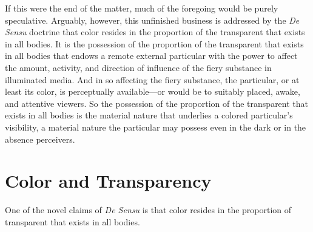 If this were the end of the matter, much of the foregoing would be purely speculative. Arguably, however, this unfinished business is addressed by the \emph{De Sensu} doctrine that color resides in the proportion of the transparent that exists in all bodies. It is the possession of the proportion of the transparent that exists in all bodies that endows a remote external particular with the power to affect the amount, activity, and direction of influence of the fiery substance in illuminated media. And in so affecting the fiery substance, the particular, or at least its color, is perceptually available---or would be to suitably placed, awake, and attentive viewers. So the possession of the proportion of the transparent that exists in all bodies is the material nature that underlies a colored particular's visibility, a material nature the particular may possess even in the dark or in the absence perceivers.


\section{Color and Transparency} %
\label{sec:color_and_transparency}

One of the novel claims of \emph{De Sensu} is that color resides in the proportion of transparent that exists in all bodies.


